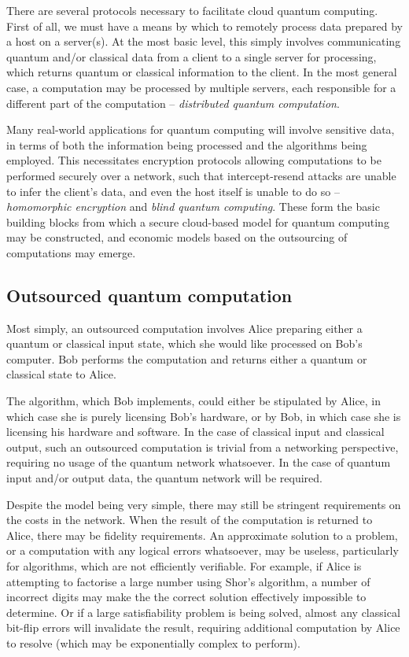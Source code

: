 \documentclass[aps, rmp, twocolumn, amsmath, amssymb, nofootinbib, superscriptaddress, longbibliography, floatfix, table-of-contents, eqsecnum]{revtex4-1}
\begin{document}
There are several protocols necessary to facilitate cloud quantum computing. First of all, we must have a means by which to remotely process data prepared by a host on a server(s). At the most basic level, this simply involves communicating quantum and/or classical data from a client to a single server for processing, which returns quantum or classical information to the client. In the most general case, a computation may be processed by multiple servers, each responsible for a different part of the computation -- \textit{distributed quantum computation}.

Many real-world applications for quantum computing will involve sensitive data, in terms of both the information being processed and the algorithms being employed. This necessitates encryption protocols allowing computations to be performed securely over a network, such that intercept-resend attacks are unable to infer the client's data, and even the host itself is unable to do so -- \textit{homomorphic encryption} and \textit{blind quantum computing}. These form the basic building blocks from which a secure cloud-based model for quantum computing may be constructed, and economic models based on the outsourcing of computations may emerge.

%
%

\subsection{Outsourced quantum computation} 

Most simply, an outsourced computation involves Alice preparing either a quantum or classical input state, which she would like processed on Bob's computer. Bob performs the computation and returns either a quantum or classical state to Alice.

The algorithm, which Bob implements, could either be stipulated by Alice, in which case she is purely licensing Bob's hardware, or by Bob, in which case she is licensing his hardware and software. In the case of classical input and classical output, such an outsourced computation is trivial from a networking perspective, requiring no usage of the quantum network whatsoever. In the case of quantum input and/or output data, the quantum network will be required.

Despite the model being very simple, there may still be stringent requirements on the costs in the network. When the result of the computation is returned to Alice, there may be fidelity requirements. An approximate solution to a problem, or a computation with any logical errors whatsoever, may be useless, particularly for algorithms, which are not efficiently verifiable. For example, if Alice is attempting to factorise a large number using Shor's algorithm, a number of incorrect digits may make the the correct solution effectively impossible to determine. Or if a large satisfiability problem is being solved, almost any classical bit-flip errors will invalidate the result, requiring additional computation by Alice to resolve (which may be exponentially complex to perform).
\end{document}
